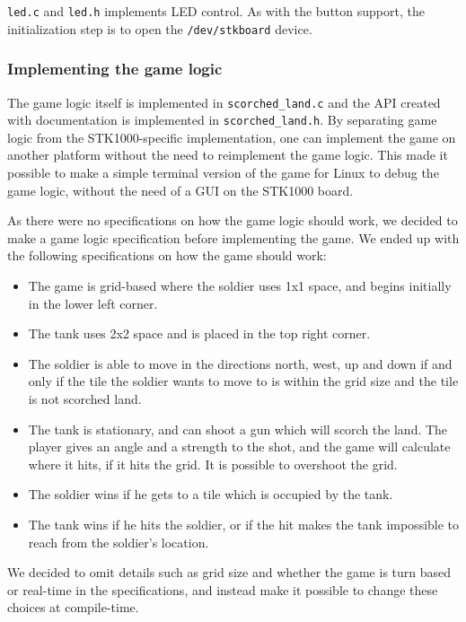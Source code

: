 \texttt{led.c} and \texttt{led.h} implements LED control. As with the
button support, the initialization step is to open the
\texttt{/dev/stkboard} device.

\subsubsection{Implementing the game logic}
\label{subsec:game-logic}

The game logic itself is implemented in \texttt{scorched\_land.c} and
the API created with documentation is implemented in
\texttt{scorched\_land.h}. By separating game logic from the
STK1000-specific implementation, one can implement the game on another
platform without the need to reimplement the game logic. This made it
possible to make a simple terminal version of the game for Linux to
debug the game logic, without the need of a GUI on the STK1000 board. 

As there were no specifications on how the game logic should work, we
decided to make a game logic specification before implementing the game.
We ended up with the following specifications on how the game should
work:
\begin{itemize}
    \item The game is grid-based where the soldier uses 1x1 space, and
            begins initially in the lower left corner.
    \item The tank uses 2x2 space and is placed in the top right corner.
    \item The soldier is able to move in the directions north, west, up
            and down if and only if the tile the soldier wants to move
            to is within the grid size and the tile is not scorched land.
    \item The tank is stationary, and can shoot a gun which will scorch
            the land. The player gives an angle and a strength to the
            shot, and the game will calculate where it hits, if it hits the grid. It is possible to overshoot the grid.
    \item The soldier wins if he gets to a tile which is
            occupied by the tank.
    \item The tank wins if he hits the soldier, or if the hit makes
            the tank impossible to reach from the soldier's location.
\end{itemize}

We decided to omit details such as grid size and whether the game is
turn based or real-time in the specifications, and instead make it
possible to change these choices at compile-time.

